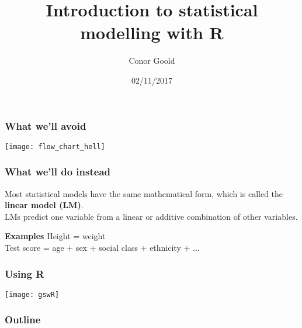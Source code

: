 \documentclass{beamer}
\title[Intro to statistical modelling with R]{Introduction to statistical modelling with R}
\author{Conor Goold}
\institute[Biovit, NMBU]{Faculty of Biosciences, \\ Norwegian University of Life Sciences}
\date{02/11/2017}
\begin{document}
\frame{\titlepage}

\begin{frame}
  \frametitle{What we'll avoid}
  \texttt{[image: flow\_chart\_hell]}
\end{frame}


\begin{frame}
  \frametitle{What we'll do instead}
  Most statistical models have the same mathematical form, which is called the
  \textbf{linear model (LM)}.\\
  \vspace{1cm}
  LMs predict one variable from a linear or additive combination of other variables.
  \vspace{1cm}
  \begin{block}{\textbf{Examples}}
    Height = weight\\
    Test score = age + sex + social class + ethnicity + ...
  \end{block}
\end{frame}


\begin{frame}
\frametitle{Using R}
\centering
\texttt{[image: gswR]}
\end{frame}


\begin{frame}
\frametitle{Outline}
\tableofcontents
\end{frame}

\end{document}
